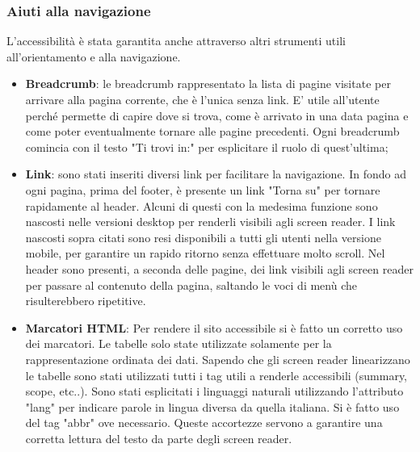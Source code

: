 \subsubsection{Aiuti alla navigazione}
 L'accessibilità è stata garantita anche attraverso altri strumenti utili all'orientamento e alla navigazione.
 \begin{itemize}
     \item \textbf{Breadcrumb}: le breadcrumb rappresentato la lista di pagine visitate per arrivare alla pagina corrente, che è l'unica senza link. E' utile all'utente perché permette di capire dove si trova, come è arrivato in una data pagina e come poter eventualmente tornare alle pagine precedenti. Ogni breadcrumb comincia con il testo "Ti trovi in:" per esplicitare il ruolo di quest'ultima;
     \item \textbf{Link}: sono stati inseriti diversi link per facilitare la navigazione. In fondo ad ogni pagina, prima del footer, è presente un link "Torna su" per tornare rapidamente al header. Alcuni di questi con la medesima funzione sono nascosti nelle versioni desktop per renderli visibili agli screen reader. 
     I link nascosti sopra citati sono resi disponibili a tutti gli utenti nella versione mobile, per garantire un rapido ritorno senza effettuare molto scroll.
     Nel header sono presenti, a seconda delle pagine, dei link visibili agli screen reader per passare al contenuto della pagina, saltando le voci di menù che risulterebbero ripetitive.
     \item \textbf{Marcatori HTML}: Per rendere il sito accessibile si è fatto un corretto uso dei marcatori.
     Le tabelle solo state utilizzate solamente per la rappresentazione ordinata dei dati. Sapendo che gli screen reader linearizzano le tabelle sono stati utilizzati tutti i tag utili a renderle accessibili (summary, scope, etc..). Sono stati esplicitati i linguaggi naturali utilizzando l'attributo "lang" per indicare parole in lingua diversa da quella italiana. Si è fatto uso del tag "abbr" ove necessario. Queste accortezze servono a garantire una corretta lettura del testo da parte degli screen reader.
 \end{itemize}